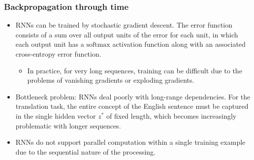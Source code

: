 \documentclass{beamer}
\begin{document}
\begin{frame}
    \frametitle{Backpropagation through time}
    \begin{itemize}
        \item RNNs can be trained by stochastic gradient descent. The error function consists of a sum over all output units of the error for each unit, in which each output unit has a $\mathrm{softmax}$ activation function along with an associated cross-entropy error function.
        \begin{itemize}
            \item In practice, for very long sequences, training can be difficult due to the problems of vanishing gradients or exploding gradients.
        \end{itemize}
        \item Bottleneck problem: RNNs deal poorly with long-range dependencies. For the translation task, the entire concept of the English sentence must be captured in the single hidden vector $z^{*}$ of fixed length, which becomes increasingly problematic with longer sequences.
        \item RNNs do not support parallel computation within a single training example due to the sequential nature of the processing.
    \end{itemize}
\end{frame}
\end{document}
